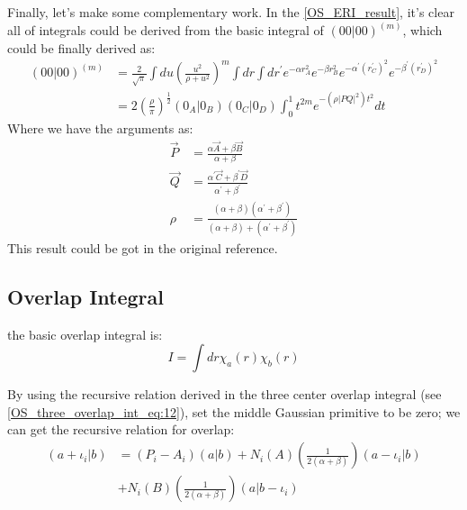 Finally, let's make some complementary work. In the \ref{OS_ERI_result},
it's clear all of integrals could be derived from the basic integral of
$(00|00)^{(m)}$, which could be finally derived as:
\begin{equation}
 \begin{split}
 (00|00)^{(m)} &=\frac{2}{\sqrt{\pi}} \int du \left( \frac{u^{2}}
{\rho+u^{2}}\right)^{m}
\int dr \int dr^{'} e^{-\alpha r_{A}^{2}} e^{-\beta r_{B}^{2}}
e^{-\alpha^{'} (r^{'}_{C})^{2}}e^{-\beta^{'} (r^{'}_{D})^{2}} \\
&= 2\left( \frac{\rho}{\pi}\right)^{\frac{1}{2}}(0_{A}|0_{B})
(0_{C}|0_{D})\int^{1}_{0} t^{2m} e^{-(\rho|PQ|^{2})t^{2}} dt 
 \end{split}
\label{OS_ERI_complementary_result}
\end{equation}
Where we have the arguments as:
\begin{align}
 \overrightarrow{P} &= \frac{\alpha \overrightarrow{A} + \beta
\overrightarrow{B}}{\alpha + \beta} \nonumber \\
\overrightarrow{Q} &= \frac{\alpha^{'} \overrightarrow{C} + \beta^{'}
\overrightarrow{D}}{\alpha^{'} + \beta^{'}} \nonumber \\
\rho &= \frac{(\alpha+\beta)(\alpha^{'}+\beta^{'})}
{(\alpha+\beta)+(\alpha^{'}+\beta^{'})}
\end{align}
This result could be got in the original reference.
    
\subsection{Overlap Integral}
%
%
%
the basic overlap integral is:
\begin{equation}
 \label{OS_overlap_eq:1}
I = \int dr \chi_{a}(r) \chi_{b}(r)
\end{equation}

By using the recursive relation derived in the three center overlap
integral (see \ref{OS_three_overlap_int_eq:12}), set the middle Gaussian
primitive to be zero; we can get the recursive relation for overlap:
\begin{equation}
\begin{split}
(a+\iota_{i}|b) &= 
(P_{i} - A_{i})(a|b) + 
N_{i}(A)\left(\frac{1}{2(\alpha+\beta)}\right)(a-\iota_{i}|b) \\
&+ 
N_{i}(B)\left(\frac{1}{2(\alpha+\beta)}\right)(a|b-\iota_{i})  
\end{split}
\label{OS_overlap_result}
\end{equation}

